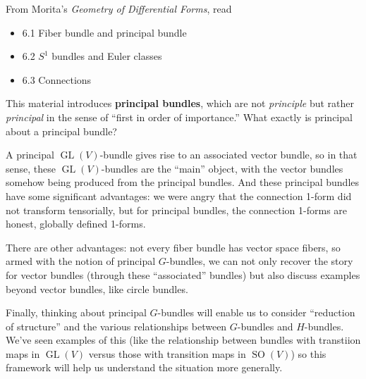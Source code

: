 \documentclass{homework}
\author{Jim Fowler}
\date{Week 15: Fiber Bundles}
\DeclareMathOperator{\GL}{GL}
\DeclareMathOperator{\SO}{SO}
\begin{document}
\maketitle

From Morita's \textit{Geometry of Differential Forms}, read
\begin{itemize}
\item 6.1 Fiber bundle and principal bundle
\item 6.2 $S^1$ bundles and Euler classes
\item 6.3 Connections
\end{itemize} This material introduces \textbf{principal bundles},
which are not \textit{principle} but rather \textit{principal} in the
sense of ``first in order of importance.''  What exactly is principal
about a principal bundle?

A principal $\GL(V)$-bundle gives rise to an associated vector bundle,
so in that sense, these $\GL(V)$-bundles are the ``main'' object, with
the vector bundles somehow being produced from the principal bundles.
And these principal bundles have some significant advantages: we were
angry that the connection 1-form did not transform tensorially, but
for principal bundles, the connection 1-forms are honest, globally
defined 1-forms.

There are other advantages: not every fiber bundle has vector space
fibers, so armed with the notion of principal $G$-bundles, we can not
only recover the story for vector bundles (through these
``associated'' bundles) but also discuss examples beyond vector
bundles, like circle bundles.

Finally, thinking about principal $G$-bundles will enable us to
consider ``reduction of structure'' and the various relationships
between $G$-bundles and $H$-bundles.  We've seen examples of this
(like the relationship between bundles with transtiion maps in
$\GL(V)$ versus those with transition maps in $\SO(V)$) so this
framework will help us understand the situation more generally.
\end{document}
